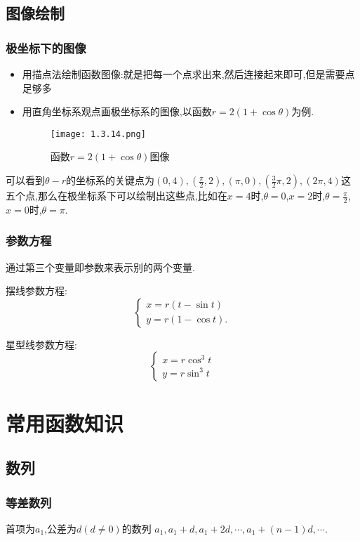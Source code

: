 \documentclass[12pt, a4paper, oneside, UTF8]{ctexbook}  %
\begin{document}
\subsection{图像绘制}

\subsubsection{极坐标下的图像}

\begin{itemize}
    \item 用描点法绘制函数图像:就是把每一个点求出来,然后连接起来即可,但是需要点足够多
    \item 用直角坐标系观点画极坐标系的图像,以函数$r=2(1+\cos \theta )$为例.
          \begin{figure}[H]
              \centering \texttt{[image: 1.3.14.png]} \caption{函数$r=2(1+\cos \theta)$图像}
          \end{figure}
\end{itemize}
可以看到$\theta - r $的坐标系的关键点为$(0,4),(\frac{\pi}{2},2),(\pi,0),(\frac{3}{2}\pi,2),(2\pi,4)$这五个点,那么在极坐标系下可以绘制出这些点,比如在$x=4$时,$\theta = 0$,$x=2$时,$\theta = \frac{\pi}{2}$,$x=0$时,$\theta = \pi$.
\subsubsection{参数方程}
通过第三个变量即参数来表示别的两个变量.

摆线参数方程:
$$
    \left\{
    \begin{array}{l}
        x=r\left(t-\sin t\right) \\
        y=r\left(1-\cos t\right).
    \end{array}
    \right.
$$

星型线参数方程:
$$
    \left\{
    \begin{array}{l}
        x=r \cos^3 t \\
        y=r \sin^3 t
    \end{array}
    \right.
$$
\section{常用函数知识}

\subsection{数列}
\subsubsection{等差数列}
首项为$a_1$,公差为$d(d \neq 0)$的数列 $a_1,a_1+d,a_1+2d,\cdots,a_1+(n-1)d,\cdots$.
\end{document}

